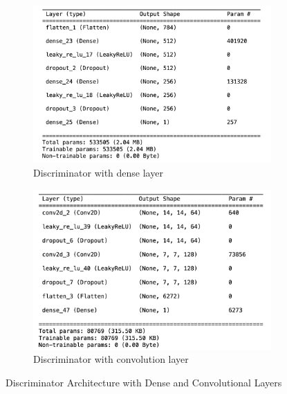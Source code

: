 \begin{figure}[H]
    \centering
    \begin{subfigure}[b]{0.45\linewidth}
        \centering
        \includegraphics[width=\linewidth]{./Images/discriminator_dense.jpg}
        \caption{Discriminator with dense layer}
        \label{fig:disc_dense}
    \end{subfigure}
    \hspace{0.05\linewidth}
    \begin{subfigure}[b]{0.45\linewidth}
        \centering
        \includegraphics[width=\linewidth]{./Images/discriminator_cnn.jpg}
        \caption{Discriminator with convolution layer}
        \label{fig:disc_conv}
    \end{subfigure}
    \caption{Discriminator Architecture with Dense and Convolutional Layers}
    \label{fig:disc_architecture}
\end{figure}


